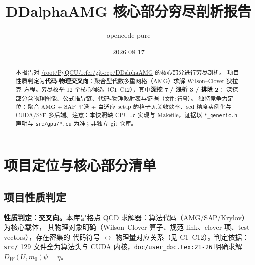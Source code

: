 \documentclass[UTF8]{ctexart}
\title{DDalphaAMG 核心部分穷尽剖析报告}
\author{opencode pure}
\date{2026-08-17}
\begin{document}
\maketitle

\begin{abstract}
本报告对 \url{/root/PyQCU/refer/git-rep/DDalphaAMG} 的核心部分进行穷尽剖析。
项目性质判定为\textbf{代码-物理交叉向}：聚合型代数多重网格（AMG）求解 Wilson--Clover 狄拉克
方程。穷尽枚举 12 个核心候选（C1--C12），其中\textbf{深挖 7 / 浅析 3 / 排除 2}：
深挖部分含物理图像、公式推导链、代码-物理映射表与证据（\texttt{文件:行号}）。
独特竞争力定位：聚合 AMG + SAP 平滑 + 自适应 setup 的格子无关收敛率、sed 精度实例化与
CUDA/SSE 多后端。注意：本快照缺 CPU \texttt{.c} 实现与 Makefile，证据以
\texttt{*\_generic.h} 声明与 \texttt{src/gpu/*.cu} 为准；非独立 git 仓库。
\end{abstract}

\tableofcontents

\section{项目定位与核心部分清单}

\subsection{项目性质判定}
\begin{keybox}
\textbf{性质判定：交叉向。}本库是格点 QCD 求解器：算法代码（AMG/SAP/Krylov）为核心载体，
其物理对象明确（Wilson--Clover 算子、规范 link、clover 项、test vectors），存在密集的
代码符号 $\leftrightarrow$ 物理量对应关系（见 C1--C12）。判定依据：\texttt{src/} 129 文件全为算法头与 CUDA
内核，\texttt{doc/user\_doc.tex:21-26} 明确求解 $D_W(U,m_0)\psi=\eta$。
\end{keybox}
\end{document}
